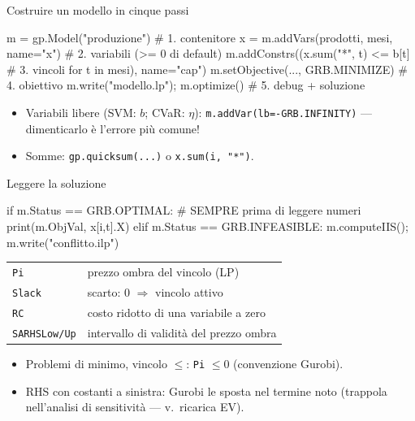 \documentclass[11pt,aspectratio=169]{beamer}
\begin{document}
\begin{frame}[fragile]{Costruire un modello in cinque passi}
\begin{semiverbatim}\small
m = gp.Model("produzione")                   \textcolor{grigiomedio}{# 1. contenitore}
x = m.addVars(prodotti, mesi, name="x")      \textcolor{grigiomedio}{# 2. variabili (>= 0 di default)}
m.addConstrs((x.sum("*", t) <= b[t]          \textcolor{grigiomedio}{# 3. vincoli}
              for t in mesi), name="cap")
m.setObjective(..., GRB.MINIMIZE)            \textcolor{grigiomedio}{# 4. obiettivo}
m.write("modello.lp"); m.optimize()          \textcolor{grigiomedio}{# 5. debug + soluzione}
\end{semiverbatim}
\begin{itemize}
  \item Variabili \alert{libere} (SVM: $b$; CVaR: $\eta$):
        \texttt{m.addVar(lb=-GRB.INFINITY)} --- dimenticarlo è l'errore più comune!
  \item Somme: \texttt{gp.quicksum(...)} o \texttt{x.sum(i, "*")}.
\end{itemize}
\end{frame}

\begin{frame}[fragile]{Leggere la soluzione}
\begin{semiverbatim}\small
if m.Status == GRB.OPTIMAL:      \textcolor{grigiomedio}{# SEMPRE prima di leggere numeri}
    print(m.ObjVal, x[i,t].X)
elif m.Status == GRB.INFEASIBLE:
    m.computeIIS(); m.write("conflitto.ilp")
\end{semiverbatim}
\begin{center}\small
\begin{tabular}{ll}
\toprule
\texttt{Pi} & prezzo ombra del vincolo (LP) \\
\texttt{Slack} & scarto: $0$ $\Rightarrow$ vincolo attivo \\
\texttt{RC} & costo ridotto di una variabile a zero \\
\texttt{SARHSLow/Up} & intervallo di validità del prezzo ombra \\
\bottomrule
\end{tabular}
\end{center}
\begin{itemize}
  \item Problemi di minimo, vincolo $\le$: \texttt{Pi} $\le 0$ (convenzione Gurobi).
  \item RHS con costanti a sinistra: Gurobi le sposta nel termine noto
        (\alert{trappola} nell'analisi di sensitività --- v.\ ricarica EV).
\end{itemize}
\end{frame}
\end{document}
